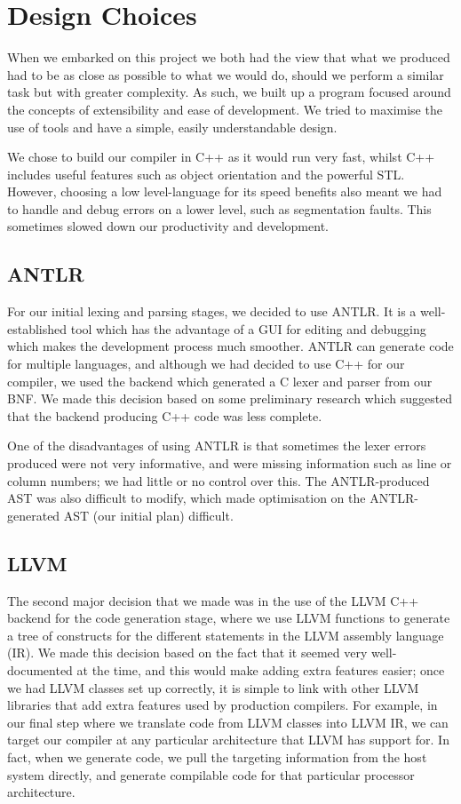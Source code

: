 \documentclass[a4wide, 11pt]{article}
\begin{document}
\section{Design Choices}

When we embarked on this project we both had the view that what we produced had to be as close as possible to what we would do, should we perform a similar task but with greater complexity. As such, we built up a program focused around the concepts of extensibility and ease of development. We tried to maximise the use of tools and have a simple, easily understandable design.

We chose to build our compiler in C++ as it would run very fast, whilst C++ includes useful features such as object orientation and the powerful STL. However, choosing a low level-language for its speed benefits also meant we had to handle and debug errors on a lower level, such as segmentation faults. This sometimes slowed down our productivity and development.

\subsection{ANTLR}

For our initial lexing and parsing stages, we decided to use ANTLR. It is a well-established tool which has the advantage of a GUI for editing and debugging which makes the development process much smoother. ANTLR can generate code for multiple languages, and although we had decided to use C++ for our compiler, we used the backend which generated a C lexer and parser from our BNF. We made this decision based on some preliminary research which suggested that the backend producing C++ code was less complete. 

One of the disadvantages of using ANTLR is that sometimes the lexer errors produced were not very informative, and were missing information such as line or column numbers; we had little or no control over this. The ANTLR-produced AST was also difficult to modify, which made optimisation on the ANTLR-generated AST (our initial plan) difficult.

\subsection{LLVM}

The second major decision that we made was in the use of the LLVM C++ backend for the code generation stage, where we use LLVM functions to generate a tree of constructs for the different statements in the LLVM assembly language (IR). We made this decision based on the fact that it seemed very well-documented at the time, and this would make adding extra features easier; once we had LLVM classes set up correctly, it is simple to link with other LLVM libraries that add extra features used by production compilers. For example, in our final step where we translate code from LLVM classes into LLVM IR, we can target our compiler at any particular architecture that LLVM has support for. In fact, when we generate code, we pull the targeting information from the host system directly, and generate compilable code for that particular processor architecture.
\end{document}
